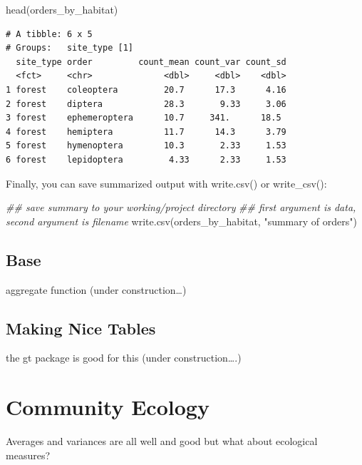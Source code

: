 \documentclass[
  letterpaper,
  DIV=11,
  numbers=noendperiod]{scrreprt}
\newenvironment{Shaded}{\begin{snugshade}}{\end{snugshade}}
\newcommand{\DocumentationTok}[1]{\textcolor[rgb]{0.37,0.37,0.37}{\textit{#1}}}
\newcommand{\FunctionTok}[1]{\textcolor[rgb]{0.28,0.35,0.67}{#1}}
\newcommand{\NormalTok}[1]{\textcolor[rgb]{0.00,0.23,0.31}{#1}}
\newcommand{\StringTok}[1]{\textcolor[rgb]{0.13,0.47,0.30}{#1}}
\begin{document}
\begin{Shaded}
\begin{Highlighting}[]
\FunctionTok{head}\NormalTok{(orders\_by\_habitat)}
\end{Highlighting}
\end{Shaded}

\begin{verbatim}
# A tibble: 6 x 5
# Groups:   site_type [1]
  site_type order         count_mean count_var count_sd
  <fct>     <chr>              <dbl>     <dbl>    <dbl>
1 forest    coleoptera         20.7      17.3      4.16
2 forest    diptera            28.3       9.33     3.06
3 forest    ephemeroptera      10.7     341.      18.5 
4 forest    hemiptera          11.7      14.3      3.79
5 forest    hymenoptera        10.3       2.33     1.53
6 forest    lepidoptera         4.33      2.33     1.53
\end{verbatim}

Finally, you can save summarized output with write.csv() or
write\_csv():

\begin{Shaded}
\begin{Highlighting}[]
\DocumentationTok{\#\# save summary to your working/project directory}
\DocumentationTok{\#\# first argument is data, second argument is filename}
\FunctionTok{write.csv}\NormalTok{(orders\_by\_habitat, }\StringTok{"summary of orders"}\NormalTok{)}
\end{Highlighting}
\end{Shaded}

\subsection{Base}\label{base-3}

aggregate function (under construction\ldots)

\subsection{Making Nice Tables}\label{making-nice-tables}

the gt package is good for this (under construction\ldots.)

\section{Community Ecology}\label{community-ecology}

Averages and variances are all well and good but what about ecological
measures?
\end{document}
